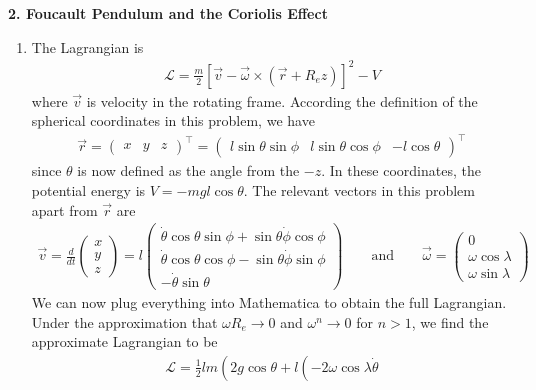 \documentclass{article}
\theoremstyle{definition}
\newcommand{\lag}{\mathcal{L}}
\newcommand{\f}[2]{\frac{#1}{#2}}
\newcommand{\lb}{\left[}
\newcommand{\rb}{\right]}
\begin{document}
\newpage







\noindent \textbf{2. Foucault Pendulum and the Coriolis Effect}

\begin{enumerate}[label=(\alph*)]
	\item The Lagrangian is 
	\begin{align*}
	\lag = \f{m}{2}\lb \vec{v} - \vec{\omega} \times (\vec{r} + R_e \hat{z})  \rb^2 -V
	\end{align*}
	where $\vec{v}$ is velocity in the rotating frame. According the definition of the spherical coordinates in this problem, we have
	\begin{align*}
	\vec{r} = \begin{pmatrix}
	x & y & z
	\end{pmatrix}^\top
	= 
	\begin{pmatrix}
	l\sin\theta\sin\phi & 
	l\sin\theta\cos\phi &
	-l\cos\theta
	\end{pmatrix}^\top
	\end{align*}
	since $\theta$ is now defined as the angle from the $-\hat{z}$. In these coordinates, the potential energy is $V = -mgl\cos\theta$. The relevant vectors in this problem apart from $\vec{r}$ are
	\begin{align*}
	\vec{v} = \f{d}{dt}\begin{pmatrix}
	x\\y\\z
	\end{pmatrix} = 
	l\begin{pmatrix}
	\dot\theta \cos \theta \sin\phi+\sin\theta\dot\phi\cos\phi \\
	\dot\theta \cos\theta \cos\phi-\sin
	\theta \dot\phi \sin\phi\\
	-\dot\theta \sin \theta
	\end{pmatrix}
	\quad \quad \text{and} \quad\quad
	\vec{\omega} = \begin{pmatrix}
	0 \\ \omega \cos\lambda \\ \omega\sin\lambda
	\end{pmatrix}
	\end{align*}
	We can now plug everything into Mathematica to obtain the full Lagrangian. Under the approximation that $\omega R_e \to 0$ and $\omega^n \to 0$ for $n > 1$, we find the approximate Lagrangian to be
	\begin{align*}
	\lag = \frac{1}{2} l m \left(2 g \cos\theta+l \left(-2 \omega  \cos\lambda  \dot\theta

\end{align*}
\end{enumerate}
\end{document}
